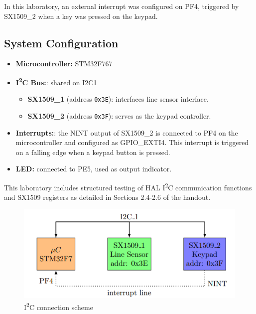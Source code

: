 In this laboratory, an external interrupt was configured on PF4, triggered by SX1509\_2 when a key was pressed on the keypad.


\subsection{System Configuration}
\label{sec:system_configuration}

\begin{itemize}
    \item \textbf{Microcontroller:} STM32F767
    \item \textbf{I\textsuperscript{2}C Bus:}: shared on I2C1
    \begin{itemize}
        \item \textbf{SX1509\_1} (address \texttt{0x3E}): interfaces line sensor interface.
        \item \textbf{SX1509\_2} (address \texttt{0x3F}): serves as the keypad controller.
    \end{itemize}
    \item \textbf{Interrupts:}: the NINT output of SX1509\_2 is connected to PF4 on the microcontroller and configured as GPIO\_EXTI4. This interrupt is triggered on a falling edge when a keypad button is pressed.
    \item \textbf{LED:} connected to PE5, used as output indicator.
\end{itemize}

This laboratory includes structured testing of HAL I\textsuperscript{2}C communication functions and SX1509 registers as detailed in Sections 2.4-2.6 of the handout.

\bigskip





\begin{figure}[H]
    \centering
    \includegraphics[width=0.55\linewidth]{lab1-2/figures/I2C_scheme.png}
    \caption{I\textsuperscript{2}C connection scheme}
    \label{fig:I2C}
\end{figure}


